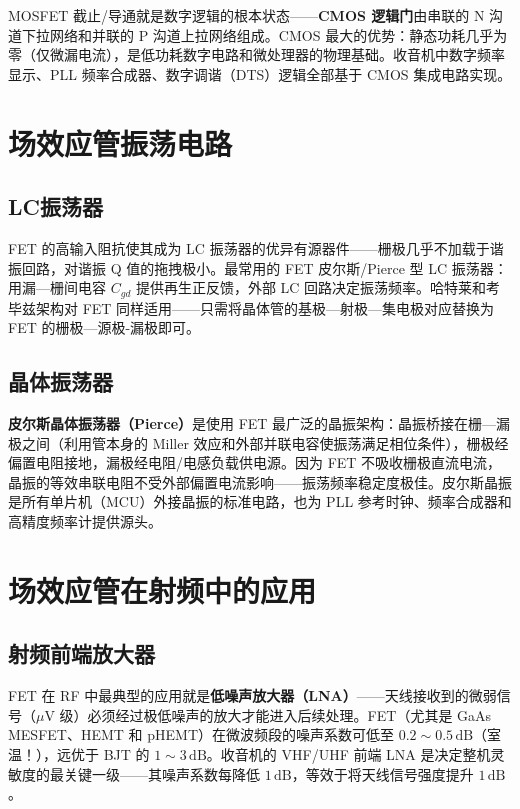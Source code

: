 \documentclass[12pt,UTF8]{ctexbook}
\begin{document}
MOSFET 截止/导通就是数字逻辑的根本状态——\textbf{CMOS 逻辑门}由串联的 N 沟道下拉网络和并联的 P 沟道上拉网络组成。CMOS 最大的优势：静态功耗几乎为零（仅微漏电流），是低功耗数字电路和微处理器的物理基础。收音机中数字频率显示、PLL 频率合成器、数字调谐（DTS）逻辑全部基于 CMOS 集成电路实现。

\section{场效应管振荡电路}
\label{sec:fet_oscillator}

\subsection{LC振荡器}

FET 的高输入阻抗使其成为 LC 振荡器的优异有源器件——栅极几乎不加载于谐振回路，对谐振 Q 值的拖拽极小。最常用的 FET 皮尔斯/Pierce 型 LC 振荡器：用漏—栅间电容 $C_{gd}$ 提供再生正反馈，外部 LC 回路决定振荡频率。哈特莱和考毕兹架构对 FET 同样适用——只需将晶体管的基极—射极—集电极对应替换为 FET 的栅极—源极-漏极即可。

\subsection{晶体振荡器}

\textbf{皮尔斯晶体振荡器（Pierce）}是使用 FET 最广泛的晶振架构：晶振桥接在栅—漏极之间（利用管本身的 Miller 效应和外部并联电容使振荡满足相位条件），栅极经偏置电阻接地，漏极经电阻/电感负载供电源。因为 FET 不吸收栅极直流电流，晶振的等效串联电阻不受外部偏置电流影响——振荡频率稳定度极佳。皮尔斯晶振是所有单片机（MCU）外接晶振的标准电路，也为 PLL 参考时钟、频率合成器和高精度频率计提供源头。

\section{场效应管在射频中的应用}
\label{sec:fet_rf_applications}

\subsection{射频前端放大器}

FET 在 RF 中最典型的应用就是\textbf{低噪声放大器（LNA）}——天线接收到的微弱信号（$\mu\mathrm{V}$ 级）必须经过极低噪声的放大才能进入后续处理。FET（尤其是 GaAs MESFET、HEMT 和 pHEMT）在微波频段的噪声系数可低至 $0.2\sim0.5\,\mathrm{dB}$（室温！），远优于 BJT 的 $1\sim3\,\mathrm{dB}$。收音机的 VHF/UHF 前端 LNA 是决定整机灵敏度的最关键一级——其噪声系数每降低 $1\,\mathrm{dB}$，等效于将天线信号强度提升 $1\,\mathrm{dB}$。
\end{document}
